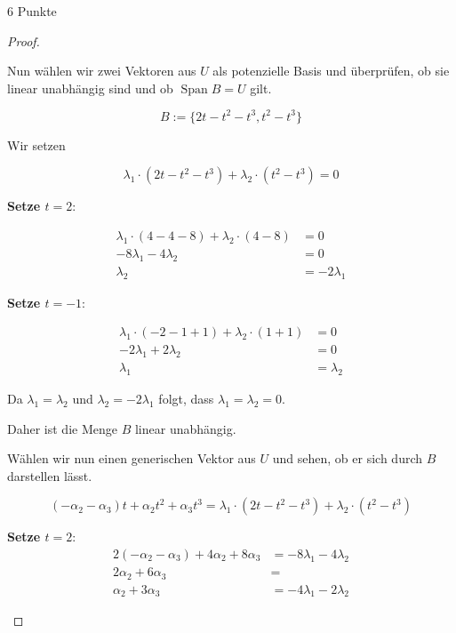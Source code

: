 \documentclass{../problemset}
\begin{document}
\begin{problem}{6 Punkte}
\begin{proof}
\begin{enumerate}
		      Nun wählen wir zwei Vektoren aus $U$ als potenzielle Basis und überprüfen, ob sie linear unabhängig sind und ob $\operatorname{Span} B = U$ gilt.

		      \[
			      B := \{2t - t^2 - t^3, t^2 - t^3\}
		      \]

		      Wir setzen

		      \[
			      \lambda_1 \cdot (2t - t^2 - t^3) + \lambda_2 \cdot (t^2 - t^3) = 0
		      \]

		      \textbf{Setze $t = 2$}:

		      \begin{align*}
			      \lambda_1 \cdot (4 - 4 - 8) + \lambda_2 \cdot (4 - 8) & = 0            \\
			      -8 \lambda_1 - 4 \lambda_2                            & = 0            \\
			      \lambda_2                                             & = -2 \lambda_1
		      \end{align*}

		      \textbf{Setze $t = -1$}:

		      \begin{align*}
			      \lambda_1 \cdot (-2 - 1 + 1) + \lambda_2 \cdot (1 + 1) & = 0         \\
			      -2 \lambda_1 + 2 \lambda_2                             & = 0         \\
			      \lambda_1                                              & = \lambda_2
		      \end{align*}

		      Da $\lambda_1 = \lambda_2$ und $\lambda_2 = -2 \lambda_1$ folgt, dass $\lambda_1 = \lambda_2 = 0$.

		      Daher ist die Menge $B$ linear unabhängig.

		      Wählen wir nun einen generischen Vektor aus $U$ und sehen, ob er sich durch $B$ darstellen lässt.

		      \[
			      (-\alpha_2 - \alpha_3)t + \alpha_2t^2 + \alpha_3t^3 = \lambda_1 \cdot (2t - t^2 - t^3) + \lambda_2 \cdot (t^2 - t^3)
		      \]

		      \textbf{Setze $t = 2$}:
		      \begin{align*}
			      2(-\alpha_2 - \alpha_3) + 4\alpha_2 + 8\alpha_3 & = -8 \lambda_1 - 4 \lambda_2 \\
			      2\alpha_2 + 6\alpha_3                           & =                            \\
			      \alpha_2 + 3\alpha_3                            & = -4 \lambda_1 - 2 \lambda_2
		      \end{align*}


\end{enumerate}
\end{proof}
\end{problem}
\end{document}
